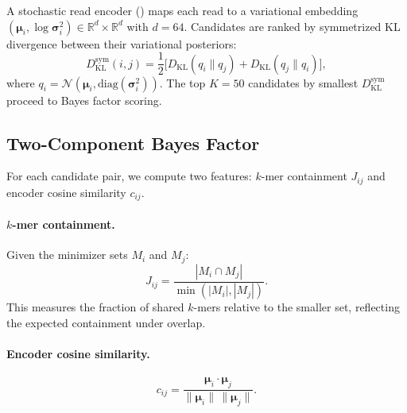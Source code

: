 \documentclass[11pt,a4paper]{article}
\newcommand{\bmu}{\boldsymbol{\mu}}
\newcommand{\Real}{\mathbb{R}}
\newcommand{\KL}{\mathrm{KL}}
\begin{document}
A stochastic read encoder () maps each read to a
variational embedding $(\bmu_i, \log\boldsymbol{\sigma}^2_i) \in
\Real^{d} \times \Real^{d}$ with $d = 64$.  Candidates are ranked by
symmetrized KL divergence between their variational posteriors:
\begin{equation}
  \label{eq:kl-sym}
  D_{\KL}^{\mathrm{sym}}(i, j)
    = \frac{1}{2}\bigl[D_{\KL}(q_i \| q_j) + D_{\KL}(q_j \| q_i)\bigr],
\end{equation}
where $q_i = \mathcal{N}(\bmu_i, \mathrm{diag}(\boldsymbol{\sigma}^2_i))$.
The top $K = 50$ candidates by smallest $D_{\KL}^{\mathrm{sym}}$
proceed to Bayes factor scoring.

\subsection{Two-Component Bayes Factor}
\label{sec:bayes-factor}

For each candidate pair, we compute two features: $k$-mer containment
$J_{ij}$ and encoder cosine similarity $c_{ij}$.

\paragraph{$k$-mer containment.}
Given the minimizer sets $M_i$ and $M_j$:
\begin{equation}
  J_{ij} = \frac{|M_i \cap M_j|}{\min(|M_i|, |M_j|)}.
\end{equation}
This measures the fraction of shared $k$-mers relative to the smaller
set, reflecting the expected containment under overlap.

\paragraph{Encoder cosine similarity.}
\begin{equation}
  c_{ij} = \frac{\bmu_i \cdot \bmu_j}{\|\bmu_i\| \, \|\bmu_j\|}.
\end{equation}
\end{document}
